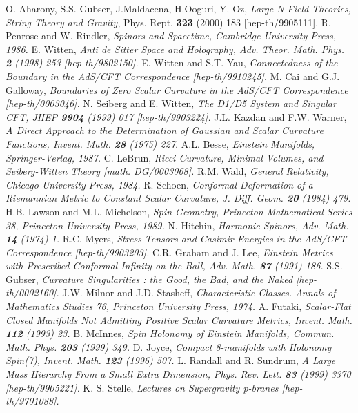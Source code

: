 \documentclass[a4paper,12pt]{article}
\theoremstyle{definition}
\renewcommand{\-}{$\dfrac{\quad\enspace}{\quad}$}
\begin{document}
\begin{thebibliography}{4} 

 O. Aharony, S.S. Gubser, J.Maldacena, H.Ooguri, Y. Oz, \emph{Large N Field Theories, String Theory and Gravity}, Phys. Rept. {\bf 323} (2000) 183 [hep-th/9905111].
 R. Penrose and W. Rindler, \emph{Spinors and Spacetime, Cambridge University Press, 1986.}
 E. Witten, \emph{Anti de Sitter Space and Holography, Adv. Theor. Math. Phys. {\bf 2} (1998) 253 [hep-th/9802150].}
 E. Witten and S.T. Yau, \emph{Connectedness of the Boundary in the AdS/CFT Correspondence [hep-th/9910245].}
 M. Cai and G.J. Galloway, \emph{Boundaries of Zero Scalar Curvature in the AdS/CFT Correspondence [hep-th/0003046].}
 N. Seiberg and E. Witten, \emph{The D1/D5 System and Singular CFT, JHEP {\bf 9904} (1999) 017 [hep-th/9903224].}
 J.L. Kazdan and F.W. Warner, \emph{A Direct Approach to the Determination of Gaussian and Scalar Curvature Functions, Invent. Math. {\bf 28} (1975) 227.}
 A.L. Besse, \emph{Einstein Manifolds, Springer-Verlag, 1987.}
 C. LeBrun, \emph{Ricci Curvature, Minimal Volumes, and Seiberg-Witten Theory [math. DG/0003068].}
 R.M. Wald, \emph{General Relativity, Chicago University Press, 1984.}
 R. Schoen, \emph{Conformal Deformation of a Riemannian Metric to Constant Scalar Curvature, J. Diff. Geom. {\bf 20} (1984) 479.}
 H.B. Lawson and M.L. Michelson, \emph{Spin Geometry, Princeton Mathematical Series 38, Princeton University Press, 1989.}
 N. Hitchin, \emph{Harmonic Spinors, Adv. Math. {\bf 14} (1974) 1.}
 R.C. Myers, \emph{Stress Tensors and Casimir Energies in the AdS/CFT Correspondence [hep-th/9903203].}
 C.R. Graham and J. Lee, \emph{Einstein Metrics with Prescribed Conformal Infinity on the Ball, Adv. Math. {\bf 87} (1991) 186.}
 S.S. Gubser, \emph{Curvature Singularities : the Good, the Bad, and the Naked [hep-th/0002160].}
 J.W. Milnor and J.D. Stasheff, \emph{Characteristic Classes. Annals of Mathematics Studies 76, Princeton University Press, 1974.}
 A. Futaki, \emph{Scalar-Flat Closed Manifolds Not Admitting Positive Scalar Curvature Metrics, Invent. Math. {\bf 112} (1993) 23.}
 B. McInnes, \emph{Spin Holonomy of Einstein Manifolds, Commun. Math. Phys. {\bf 203} (1999) 349.}
 D. Joyce, \emph{Compact 8-manifolds with Holonomy Spin(7), Invent. Math. {\bf 123} (1996) 507.}
 L. Randall and R. Sundrum, \emph{A Large Mass Hierarchy From a Small Extra Dimension, Phys. Rev. Lett. {\bf 83} (1999) 3370 [hep-th/9905221].}
 K. S. Stelle, \emph{Lectures on Supergravity p-branes [hep-th/9701088].}
\end{thebibliography}
\end{document}
